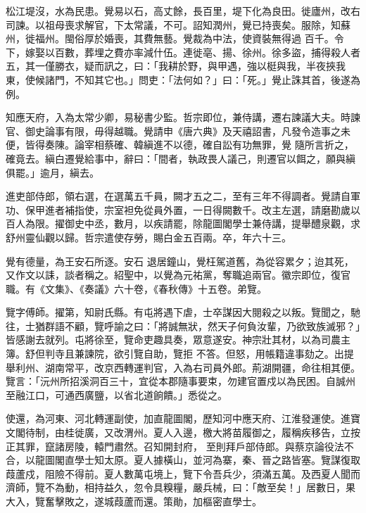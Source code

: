 \begin{pinyinscope}
 松江堤沒，水為民患。覺易以石，高丈餘，長百里，堤下化為良田。徙廬州，改右司諫。以祖母喪求解官，下太常議，不可。詔知潤州，覺已持喪矣。服除，知蘇州，徙福州。閩俗厚於婚喪，其費無藝。覺裁為中法，使資裝無得過
 百千。令下，嫁娶以百數，葬埋之費亦率減什伍。連徙亳、揚、徐州。徐多盜，捕得殺人者五，其一僅勝衣，疑而訊之，曰：「我耕於野，與甲遇，強以梃與我，半夜挾我東，使候諸門，不知其它也。」問吏：「法何如？」曰：「死。」覺止誅其首，後遂為例。



 知應天府，入為太常少卿，易秘書少監。哲宗即位，兼侍講，遷右諫議大夫。時諫官、御史論事有限，毋得越職。覺請申《唐六典》及天禧詔書，凡發令造事之未便，皆得奏陳。論宰相蔡確、韓縝進不以德，確自訟有功無罪，覺
 隨所言折之，確竟去。縝白遷覺給事中，辭曰：「間者，執政畏人議己，則遷官以餌之，願與縝俱罷。」逾月，縝去。



 進吏部侍郎，領右選，在選萬五千員，闕才五之二，至有三年不得調者。覺請自軍功、保甲進者補指使，宗室袒免從員外置，一日得闕數千。改主左選，請磨勘歲以百人為限。擢御史中丞，數月，以疾請罷，除龍圖閣學士兼侍講，提舉醴泉觀，求舒州靈仙觀以歸。哲宗遣使存勞，賜白金五百兩。卒，年六十三。



 覺有德量，為王安石所逐。安石
 退居鐘山，覺枉駕道舊，為從容累夕；迨其死，又作文以誄，談者稱之。紹聖中，以覺為元祐黨，奪職追兩官。徽宗即位，復官職。有《文集》、《奏議》六十卷，《春秋傳》十五卷。弟覽。



 覽字傅師。擢第，知尉氏縣。有屯將遇下虐，士卒謀因大閱殺之以叛。覽聞之，馳往，士猶群語不顧，覽呼諭之曰：「將誠無狀，然天子何負汝輩，乃欲致族滅邪？」皆感謝去就列。屯將徐至，覽命吏趣具奏，眾意遂安。神宗壯其材，以為司農主簿。舒但判寺且兼諫院，欲引覽自助，覽拒
 不答。但怒，用帳籍違事劾之。出提舉利州、湖南常平，改京西轉運判官，入為右司員外郎。荊湖開疆，命往相其便。覽言：「沅州所招溪洞百三十，宜從本郡隨事要束，勿建官置戍以為民困。自誠州至融江口，可通西廣鹽，以省北道餉饋。」悉從之。



 使還，為河東、河北轉運副使，加直龍圖閣，歷知河中應天府、江淮發運使。進寶文閣待制，由桂徙廣，又改渭州。夏人入邊，檄大將苗履御之，履稱疾移告，立按正其罪，竄諸房陵，轅門肅然。召知開封府，
 至則拜戶部侍郎。與蔡京論役法不合，以龍圖閣直學士知太原。夏人據橫山，並河為寨，秦、晉之路皆塞。覽謀復取葭蘆戍，阻險不得前。夏人數萬屯境上，覽下令吾兵少，須滿五萬。及西夏人聞而濟師，覽不為動，相持益久，忽令具糗糧，嚴兵械，曰：「敵至矣！」居數日，果大入，覽奮擊敗之，遂城葭蘆而還。策勛，加樞密直學士。




\end{pinyinscope}
